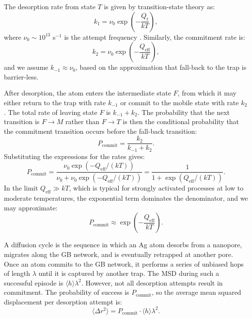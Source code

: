 \documentclass[%
preprint,
amsmath,amssymb,
aps,
]{revtex4-2}
\newcommand{\?}{\stackrel{?}{=}}
\begin{document}
The desorption rate from state $T$ is given by transition-state theory as:
\begin{equation}
k_1 = \nu_0 \exp\left( -\frac{Q_t}{kT} \right),
\end{equation}
where $\nu_0 \sim 10^{13}$ s$^{-1}$ is the attempt frequency \cite{Sholl2009}. Similarly, the commitment rate is:
\begin{equation}
k_2 = \nu_0 \exp\left( -\frac{Q_{\text{eff}}}{kT} \right),
\end{equation}
and we assume $k_{-1} \approx \nu_0$, based on the approximation that fall-back to the trap is barrier-less.

After desorption, the atom enters the intermediate state $F$, from which it may either return to the trap with rate $k_{-1}$ or commit to the mobile state with rate $k_2$. The total rate of leaving state $F$ is $k_{-1} + k_2$. The probability that the next transition is $F \to M$ rather than $F \to T$ is then the conditional probability that the commitment transition occurs before the fall-back transition:
\begin{equation}
P_{\text{commit}} = \frac{k_2}{k_{-1} + k_2}.
\end{equation}
Substituting the expressions for the rates gives:
\begin{equation}
P_{\text{commit}} = \frac{ \nu_0 \exp(-Q_{\text{eff}} / (kT))}{ \nu_0 + \nu_0 \exp(-Q_{\text{eff}} / (kT))} = \frac{1}{1 + \exp(Q_{\text{eff}} / (kT))}.
\end{equation}
In the limit $Q_{\text{eff}} \gg kT$, which is typical for strongly activated processes at low to moderate temperatures, the exponential term dominates the denominator, and we may approximate:
\begin{equation}
P_{\text{commit}} \approx \exp\left( -\frac{Q_{\text{eff}}}{kT} \right).
\end{equation}

A diffusion cycle is the sequence in which an Ag atom desorbs from a nanopore, migrates along the GB network, and is eventually retrapped at another pore. Once an atom commits to the GB network, it performs a series of unbiased hops of length $\lambda$ until it is captured by another trap. The MSD during such a successful episode is $\langle h \rangle \lambda^2$. However, not all desorption attempts result in commitment. The probability of success is $P_{\text{commit}}$, so the average mean squared displacement per desorption attempt is:
\begin{equation}
\langle \Delta r^2 \rangle = P_{\text{commit}} \cdot \langle h \rangle \lambda^2.
\end{equation}
\end{document}
